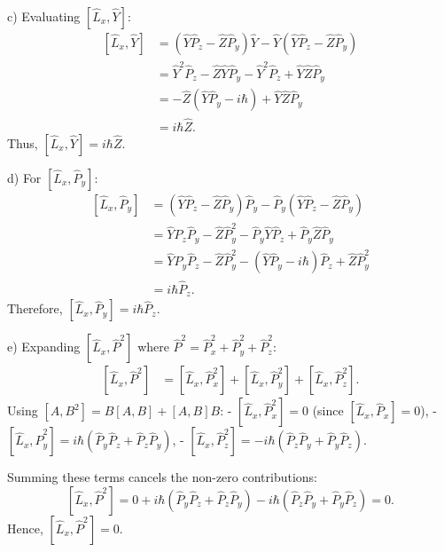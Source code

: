 \documentclass{article}
\begin{document}
\medskip

c) Evaluating \( \left[\hat{L}_x, \hat{Y}\right] \):
\[
\begin{aligned}
\left[\hat{L}_x, \hat{Y}\right] &= (\hat{Y}\hat{P}_z - \hat{Z}\hat{P}_y)\hat{Y} - \hat{Y}(\hat{Y}\hat{P}_z - \hat{Z}\hat{P}_y) \\
&= \hat{Y}^2\hat{P}_z - \hat{Z}\hat{Y}\hat{P}_y - \hat{Y}^2\hat{P}_z + \hat{Y}\hat{Z}\hat{P}_y \\
&= -\hat{Z}(\hat{Y}\hat{P}_y - i\hbar) + \hat{Y}\hat{Z}\hat{P}_y \\
&= i\hbar \hat{Z}.
\end{aligned}
\]
Thus, \( \left[\hat{L}_x, \hat{Y}\right] = i\hbar \hat{Z} \).

\medskip

d) For \( \left[\hat{L}_x, \hat{P}_y\right] \):
\[
\begin{aligned}
\left[\hat{L}_x, \hat{P}_y\right] &= (\hat{Y}\hat{P}_z - \hat{Z}\hat{P}_y)\hat{P}_y - \hat{P}_y(\hat{Y}\hat{P}_z - \hat{Z}\hat{P}_y) \\
&= \hat{Y}\hat{P}_z\hat{P}_y - \hat{Z}\hat{P}_y^2 - \hat{P}_y\hat{Y}\hat{P}_z + \hat{P}_y\hat{Z}\hat{P}_y \\
&= \hat{Y}\hat{P}_y\hat{P}_z - \hat{Z}\hat{P}_y^2 - (\hat{Y}\hat{P}_y - i\hbar)\hat{P}_z + \hat{Z}\hat{P}_y^2 \\
&= i\hbar \hat{P}_z.
\end{aligned}
\]
Therefore, \( \left[\hat{L}_x, \hat{P}_y\right] = i\hbar \hat{P}_z \).

\medskip

e) Expanding \( \left[\hat{L}_x, \hat{P}^2\right] \) where \( \hat{P}^2 = \hat{P}_x^2 + \hat{P}_y^2 + \hat{P}_z^2 \):
\[
\begin{aligned}
\left[\hat{L}_x, \hat{P}^2\right] &= \left[\hat{L}_x, \hat{P}_x^2\right] + \left[\hat{L}_x, \hat{P}_y^2\right] + \left[\hat{L}_x, \hat{P}_z^2\right].
\end{aligned}
\]
Using \( [A, B^2] = B[A, B] + [A, B]B \):
- \( \left[\hat{L}_x, \hat{P}_x^2\right] = 0 \) (since \( [\hat{L}_x, \hat{P}_x] = 0 \)),
- \( \left[\hat{L}_x, \hat{P}_y^2\right] = i\hbar(\hat{P}_y\hat{P}_z + \hat{P}_z\hat{P}_y) \),
- \( \left[\hat{L}_x, \hat{P}_z^2\right] = -i\hbar(\hat{P}_z\hat{P}_y + \hat{P}_y\hat{P}_z) \).

Summing these terms cancels the non-zero contributions:
\[
\left[\hat{L}_x, \hat{P}^2\right] = 0 + i\hbar(\hat{P}_y\hat{P}_z + \hat{P}_z\hat{P}_y) - i\hbar(\hat{P}_z\hat{P}_y + \hat{P}_y\hat{P}_z) = 0.
\]
Hence, \( \left[\hat{L}_x, \hat{P}^2\right] = 0 \).
\end{document}
